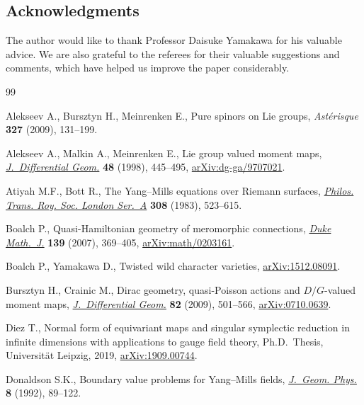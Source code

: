 \documentclass[pdftex]{sigma}
\numberwithin{equation}{section}
\theoremstyle{definition}
\begin{document}
\subsection*{Acknowledgments}
The author would like to thank Professor Daisuke Yamakawa for his valuable advice.
We are also grateful to the referees for their valuable suggestions and comments, which have helped us improve the paper considerably.

\begin{thebibliography}{99}
\footnotesize\itemsep=0pt

Alekseev A., Bursztyn H., Meinrenken E., Pure spinors on {L}ie groups,
 \textit{Ast\'{e}risque} \textbf{327} (2009), 131--199.

Alekseev A., Malkin A., Meinrenken E., Lie group valued moment maps,
 \href{https://doi.org/10.4310/jdg/1214460860}{\textit{J.~Differential Geom.}}
 \textbf{48} (1998), 445--495,
 \href{https://arxiv.org/abs/dg-ga/9707021}{arXiv:dg-ga/9707021}.

Atiyah M.F., Bott R., The {Y}ang--{M}ills equations over {R}iemann surfaces,
 \href{https://doi.org/10.1098/rsta.1983.0017}{\textit{Philos. Trans. Roy.
 Soc. London Ser.~A}} \textbf{308} (1983), 523--615.

Boalch P., Quasi-{H}amiltonian geometry of meromorphic connections,
 \href{https://doi.org/10.1215/S0012-7094-07-13924-3}{\textit{Duke Math.~J.}}
 \textbf{139} (2007), 369--405,
 \href{https://arxiv.org/abs/math/0203161}{arXiv:math/0203161}.

Boalch P., Yamakawa D., Twisted wild character varieties,
 \href{https://arxiv.org/abs/1512.08091}{arXiv:1512.08091}.

Bursztyn H., Crainic M., Dirac geometry, quasi-{P}oisson actions and
 {$D/G$}-valued moment maps,
 \href{https://doi.org/10.4310/jdg/1251122545}{\textit{J.~Differential Geom.}}
 \textbf{82} (2009), 501--566,
 \href{https://arxiv.org/abs/0710.0639}{arXiv:0710.0639}.

Diez T., Normal form of equivariant maps and singular symplectic reduction in
 infinite dimensions with applications to gauge field theory, Ph.D.~Thesis,
 {U}niversit\"at {L}eipzig, 2019,
 \href{https://arxiv.org/abs/1909.00744}{arXiv:1909.00744}.

Donaldson S.K., Boundary value problems for {Y}ang--{M}ills fields,
 \href{https://doi.org/10.1016/0393-0440(92)90044-2}{\textit{J.~Geom. Phys.}}
 \textbf{8} (1992), 89--122.


\end{thebibliography}
\end{document}

